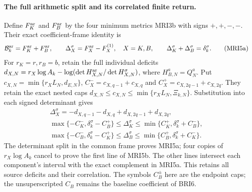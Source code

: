 \documentclass[11pt,a4paper]{article}
\begin{document}
\paragraph{The full arithmetic split and its correlated finite return.}
Define $F_K^{\rm ar}$ and $F_B^{\rm ar}$ by the four
minimum metrics MRI3b with signs $+,+,-,-$. Their exact
coefficient-frame identity is
\[
 \mathcal B_k^{\rm ar}=F_K^{\rm ar}+F_B^{\rm ar},\qquad
 \Delta_X^\sigma=F_X^{\rm ar}-F_X^{(1)},\quad X=K,B,
 \qquad\Delta_K^\sigma+\Delta_B^\sigma=\delta_k^\sigma.
 \tag{MRI5a}
\]
For $r_K=r,r_B=b$, retain the full individual deficits
$d_{X,N}=r_X\log A_k-\log(\det H_{X,N}^{\rm ar}/
\det H_{X,N}^\sigma)$, where $H_{B,N}^a=Q_N^a$.
Put $c_{X,N}=\min\{r_XL_N,d_{E,N}\}$,
$C_X^-=c_{X,q-1}+c_{X,q}$ and
$C_X^+=c_{X,2q-1}+c_{X,2q}$. They retain the exact nested
caps $d_{X,N}\le c_{X,N}\le\min\{r_XL_N,\Xi_{k,N}\}$.
Substitution into each signed determinant gives
\[
\begin{gathered}
 \Delta_X^\sigma=-d_{X,q-1}-d_{X,q}+d_{X,2q-1}+d_{X,2q},\\
 \max\{-C_K^-,\delta_k^\sigma-C_B^+\}
  \le\Delta_K^\sigma\le
          \min\{C_K^+,\delta_k^\sigma+C_B^-\},\\
 \max\{-C_B^-,\delta_k^\sigma-C_K^+\}
  \le\Delta_B^\sigma\le
          \min\{C_B^+,\delta_k^\sigma+C_K^-\}.
\end{gathered}\tag{MRI5b}
\]
The determinant split in the common frame proves MRI5a;
four copies of $r_X\log A_k$ cancel to prove the first
line of MRI5b. The other lines intersect each component's
interval with the exact complement in MRI5a. This retains
all source deficits and their correlation. The symbols
$C_B^\pm$ here are the endpoint caps; the unsuperscripted
$C_B$ remains the baseline coefficient of BRI6.
\end{document}
